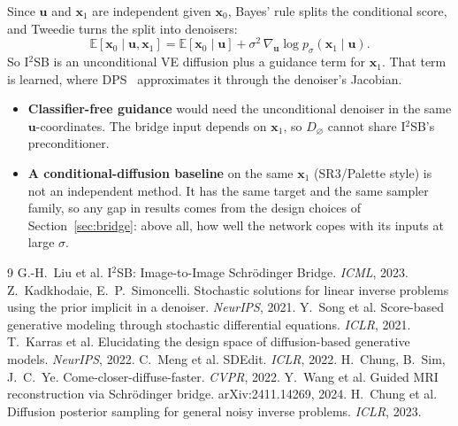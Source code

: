 \documentclass[11pt]{article}
\newcommand{\x}{\bm{x}}
\newcommand{\uu}{\bm{u}}
\newcommand{\grad}{\nabla}
\newcommand{\E}{\mathbb{E}}
\begin{document}
Since $\uu$ and $\x_1$ are independent given $\x_0$, Bayes' rule splits the conditional score,
and Tweedie turns the split into denoisers:
\begin{equation}
  \E[\x_0\mid\uu,\x_1] = \E[\x_0\mid\uu] + \sigma^2\,\grad_{\uu}\log p_\sigma(\x_1\mid\uu).
  \label{eq:bayes}
\end{equation}
So I$^2$SB is an unconditional VE diffusion plus a guidance term for $\x_1$. That term is
learned, where DPS~\cite{chung2023} approximates it through the denoiser's Jacobian.
\begin{itemize}[leftmargin=1.5em, itemsep=1pt]
  \item \textbf{Classifier-free guidance} would need the unconditional denoiser in the same
        $\uu$-coordinates. The bridge input depends on $\x_1$, so $D_\varnothing$ cannot share
        I$^2$SB's preconditioner.
  \item \textbf{A conditional-diffusion baseline} on the same $\x_1$ (SR3/Palette style) is not
        an independent method. It has the same target and the same sampler family, so any gap in
        results comes from the design choices of Section~\ref{sec:bridge}: above all, how well
        the network copes with its inputs at large $\sigma$.
\end{itemize}

\begin{thebibliography}{9}
G.-H.~Liu et al. I$^2$SB: Image-to-Image Schr\"odinger Bridge. \emph{ICML}, 2023.
Z.~Kadkhodaie, E.~P.~Simoncelli. Stochastic solutions for linear inverse problems using the
prior implicit in a denoiser. \emph{NeurIPS}, 2021.
Y.~Song et al. Score-based generative modeling through stochastic differential equations.
\emph{ICLR}, 2021.
T.~Karras et al. Elucidating the design space of diffusion-based generative models.
\emph{NeurIPS}, 2022.
C.~Meng et al. SDEdit. \emph{ICLR}, 2022.
H.~Chung, B.~Sim, J.~C.~Ye. Come-closer-diffuse-faster. \emph{CVPR}, 2022.
Y.~Wang et al. Guided MRI reconstruction via Schr\"odinger bridge. arXiv:2411.14269, 2024.
H.~Chung et al. Diffusion posterior sampling for general noisy inverse problems.
\emph{ICLR}, 2023.
\end{thebibliography}
\end{document}

